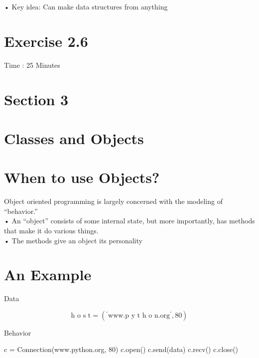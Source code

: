 \documentclass[
  letterpaper,
  DIV=11,
  numbers=noendperiod]{scrreprt}
\newenvironment{Shaded}{\begin{snugshade}}{\end{snugshade}}
\newcommand{\NormalTok}[1]{\textcolor[rgb]{0.00,0.23,0.31}{#1}}
\begin{document}
• Key idea: Can make data structures from anything


\chapter{Exercise 2.6}\label{exercise-2.6}

Time : 25 Minutes


\chapter{Section 3}\label{section-3}


\chapter{Classes and Objects}\label{classes-and-objects}


\chapter{When to use Objects?}\label{when-to-use-objects}

Object oriented programming is largely concerned with the modeling of
``behavior.''\\
• An ``object'' consists of some internal state, but more importantly,
has methods that make it do various things.\\
• The methods give an object its personality


\chapter{An Example}\label{an-example}

Data

\[
\text {h o s t} = \left(^ {\prime} \mathrm {w w w}. \text {p y t h o n}. \mathrm {o r g} ^ {\prime}, 8 0\right)
\]

Behavior

\begin{Shaded}
\begin{Highlighting}[]
\NormalTok{c = Connection(\textquotesingle{}www.python.org\textquotesingle{}, 80)  }
\NormalTok{c.open()  }
\NormalTok{c.send(data)  }
\NormalTok{c.recv()  }
\NormalTok{c.close() }
\end{Highlighting}
\end{Shaded}
\end{document}
